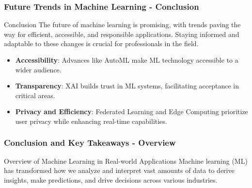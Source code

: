 \documentclass{beamer}
\begin{document}
\begin{frame}[fragile]
    \frametitle{Future Trends in Machine Learning - Conclusion}
    \begin{block}{Conclusion}
        The future of machine learning is promising, with trends paving the way for efficient, accessible, and responsible applications. Staying informed and adaptable to these changes is crucial for professionals in the field.
    \end{block}

    \begin{itemize}
        \item \textbf{Accessibility}: Advances like AutoML make ML technology accessible to a wider audience.
        \item \textbf{Transparency}: XAI builds trust in ML systems, facilitating acceptance in critical areas.
        \item \textbf{Privacy and Efficiency}: Federated Learning and Edge Computing prioritize user privacy while enhancing real-time capabilities.
    \end{itemize}
\end{frame}

\begin{frame}[fragile]
    \frametitle{Conclusion and Key Takeaways - Overview}
    \begin{block}{Overview of Machine Learning in Real-world Applications}
        Machine learning (ML) has transformed how we analyze and interpret vast amounts of data to derive insights, make predictions, and drive decisions across various industries. 
    \end{block}
\end{frame}
\end{document}
